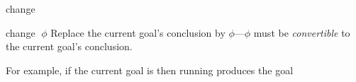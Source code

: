 \begin{tactic}{change}
  \begin{tsyntax}[empty]{change $\;\phi$}
    Replace the current goal's conclusion by $\phi$---$\phi$ must be
    \emph{convertible} to the current goal's conclusion.

  For example, if the current goal is
   then
  running 
  produces the goal
  \end{tsyntax}
\end{tactic}
